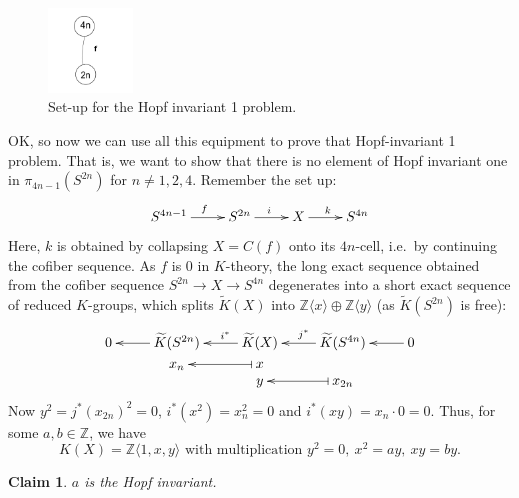 \documentclass{article}
\newcommand{\Z}{\mathbb{Z}}
\newcommand{\from}{\leftarrow}
\renewcommand{\to}{\longrightarrow}
\newtheorem{claim}[thm]{Claim}
\theoremstyle{definition}
\begin{document}
\begin{figure}
\centering\includegraphics[width=0.2\textwidth]{figures/16.pdf}
\caption{\small Set-up for the Hopf invariant 1 problem.}
\end{figure}
OK, so now we can use all this equipment to prove that Hopf-invariant 1 problem. That is, we want to show that there is no element of Hopf invariant one in $\pi_{4n-1}(S^{2n})$ for $n\neq1,2,4$. Remember the set up:
\[\xymatrix{
S^{4n-1}\ar[r]^f & S^{2n} \ar[r]^i & X \ar[r]^k & S^{4n}
}\]
Here, $k$ is obtained by collapsing $X=C(f)$ onto its $4n$-cell, i.e.\ by continuing the cofiber sequence. As $f$ is 0 in $K$-theory, the long exact sequence obtained from the cofiber sequence $S^{2n}\to X\to S^{4n}$ degenerates into a short exact sequence of reduced $K$-groups, which splits $\widetilde K(X)$ into $\Z\langle x\rangle\oplus\Z\langle y\rangle$ (as $\widetilde K(S^{2n})$ is free):
\[\xymatrix@R=0mm{
0&\ar[l]\widetilde K(S^{2n})&\ar[l]_{\ \ \ i^*}\widetilde K(X)&\ar[l]_{\ j^*}\widetilde K(S^{4n})&0\ar[l]\\
&x_n&\ar@{|->}[l]x\\
&&y&\ar@{|->}[l]x_{2n}
}\]
Now $y^2=j^*(x_{2n})^2=0$, $i^*(x^2)=x_n^2=0$ and $i^*(xy)=x_n\cdot0=0$. Thus, for some $a,b\in\Z$, we have
\[K(X)=\Z\langle1,x,y\rangle\text{ with multiplication }y^2=0,\ x^2=ay,\ xy=by.\]
\begin{claim}
$a$ is the Hopf invariant.
\end{claim}
\end{document}
